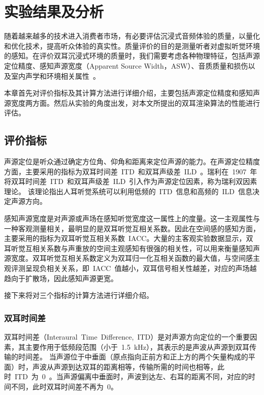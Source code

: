 
\chapter{ 实验结果及分析 }

随着越来越多的技术进入消费者市场，有必要评估沉浸式音频体验的质量，以量化和优化技术，提高听众体验的真实性。质量评价的目的是测量听者对虚拟听觉环境的感知。在评价双耳沉浸式环境的质量时，我们需要考虑各种物理特征，包括声源定位精度、感知声源宽度（Apparent Source Width，ASW）、音质质量和损伤以及室内声学和环境相关属性~。

本章首先对评价指标及其计算方法进行详细介绍，主要包括声源定位精度和感知声源宽度两方面。然后从实验的角度出发，对本文所提出的双耳渲染算法的性能进行评估。

\section{ 评价指标 }\label{sec.evaulation}

声源定位是听众通过确定方位角、仰角和距离来定位声源的能力。在声源定位精度方面，主要采用的指标为双耳时间差~ITD~和双耳声级差~ILD~。瑞利在~1907~年将双耳时间差~ITD~和双耳声级差~ILD~引入作为声源定位因素，称为瑞利双因素理论。
该理论指出人耳听觉系统可以利用低频的~ITD~信息和高频的~ILD~信息决定声源方向。

感知声源宽度是对声源或声场在感知听觉宽度这一属性上的度量。这一主观属性与一种客观测量相关，最明显的是双耳听觉互相关系数。因此在空间感的感知方面，主要采用的指标为双耳听觉互相关系数~IACC。大量的主客观实验数据显示，双耳听觉互相关系数与声重放的空间主观感知有很强的相关性，可以用来衡量感知声源宽度。双耳听觉互相关系数定义为双耳归一化互相关函数的最大值，与空间感主观评测呈现负相关关系，即~IACC~值越小，双耳信号相关性越差，对应的声场越趋向于扩散场，因此感知声源更宽。

接下来将对三个指标的计算方法进行详细介绍。

\subsection{ 双耳时间差 }

双耳时间差（Interaural~Time~Difference,~ITD）是对声源方向定位的一个重要因素，其主要作用于低频段范围（小于~1.5~kHz），其表示的是声波从声源到双耳传输的时间差。
当声源位于中垂面（原点指向正前方和正上方的两个矢量构成的平面）时，声波从声源到达双耳的距离相等，传输所需的时间也相等，此时~ITD~为~0~。当声源偏离中垂面时，声波到达左、右耳的距离不同，对应的时间不同，此时双耳时间差不再为~0。


